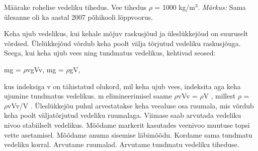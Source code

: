 
Määrake rohelise vedeliku tihedus. Vee tihedus $\rho$ = 1000 kg/m$^3$.
\textit{Märkus:} Sama ülesanne oli ka aastal 2007 põhikooli lõppvoorus.

\hint

\solu
Keha ujub vedelikus, kui kehale mõjuv raskusjõud ja üleslükkejõud on suuruselt võrdsed. Ülelükkejõud võrdub keha poolt välja tõrjutud vedeliku raskusjõuga. Seega, kui keha ujub vees ning tundmatus vedelikus, kehtivad seosed:

mg = $\rho$vgVv, mg = $\rho$gV,

kus indeksiga v on tähistatud olukord, mil keha ujub vees, indeksita aga keha ujumine tundmatus vedelikus. m elimineerimisel saame $\rho$vVv = $\rho$V , millest $\rho$ = $\rho$vVv/V . Üleslükkejõu puhul arvestatakse keha veealuse osa ruumala, mis võrdub keha poolt väljatõrjutud vedeliku ruumalaga. Viimase saab arvutada vedeliku nivoo stabiilselt vedelikus. Mõõdame markerit kasutades veenivoo muutuse topsi vette asetamisel. Mõõdame anuma sisemise läbimõõdu. Kordame sama tundmatu vedeliku korral. Arvutame ruumalad. Arvutame tundmatu vedeliku tiheduse.
\probend
